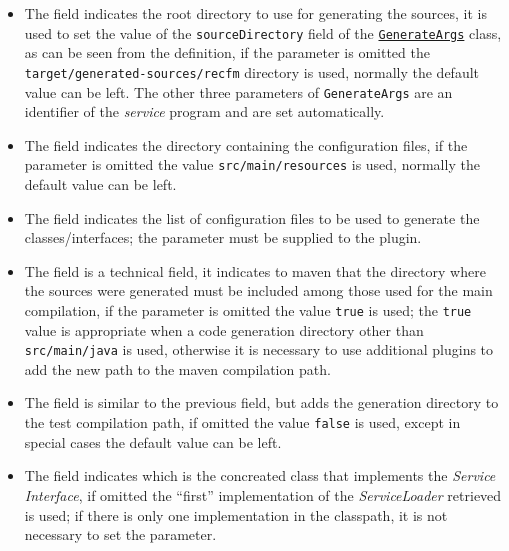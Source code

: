 \documentclass[a4paper,10pt]{report}
\begin{document}
\begin{itemize}
\item {}
    The  field indicates 
    the root directory to use for generating the sources, it is used to set the 
    value of the \verb!sourceDirectory! field of the 
    \hyperref[lst:GenerateArgs]{\texttt{GenerateArgs}} class, as can be seen 
    from the definition, if the parameter is omitted the 
    \verb!target/generated-sources/recfm! directory is used, normally the 
    default value can be left. 
    The other three parameters of \texttt{GenerateArgs} are an identifier of the 
    \textsl{service} program and are set automatically.
\item {}
    The  field indicates 
    the directory containing the configuration files, if the parameter is 
    omitted the value \verb!src/main/resources! is used, normally the default 
    value can be left.
\item {}
    The  field indicates the list 
    of configuration files to be used to generate the classes/interfaces; the 
    parameter must be supplied to the plugin.
\item {}
    The  field is a 
    technical field, it indicates to maven that the directory where the sources 
    were generated must be included among those used for the main compilation, 
    if the parameter is omitted the value \verb!true! is used; the \verb!true! 
    value is appropriate when a code generation directory other than 
    \verb!src/main/java! is used, otherwise it is necessary to use additional 
    plugins to add the new path to the maven compilation path.
\item {}
    The  field is 
    similar to the previous field, but adds the generation directory to the test 
    compilation path, if omitted the value \verb!false! is used, except in 
    special cases the default value can be left.
\item {}
    The  field 
    indicates which is the concreated class that implements the 
    \textsl{Service Interface}, if omitted the ``first'' implementation of the 
    \textsl{ServiceLoader} retrieved is used; if there is only one 
    implementation in the classpath, it is not necessary to set the parameter.
\end{itemize}
\end{document}
